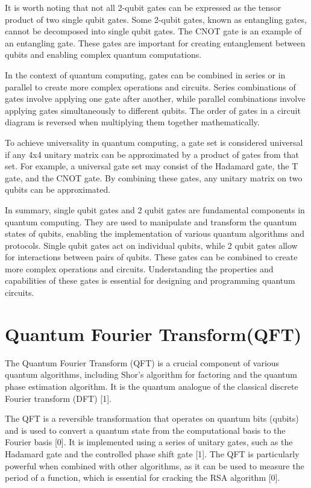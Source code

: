 \documentclass[pra,onecolumn,superscriptaddress]{revtex4}%
\begin{document}
It is worth noting that not all 2-qubit gates can be expressed as the tensor product of two single qubit gates. Some 2-qubit gates, known as entangling gates, cannot be decomposed into single qubit gates. The CNOT gate is an example of an entangling gate. These gates are important for creating entanglement between qubits and enabling complex quantum computations.

In the context of quantum computing, gates can be combined in series or in parallel to create more complex operations and circuits. Series combinations of gates involve applying one gate after another, while parallel combinations involve applying gates simultaneously to different qubits. The order of gates in a circuit diagram is reversed when multiplying them together mathematically.

To achieve universality in quantum computing, a gate set is considered universal if any 4x4 unitary matrix can be approximated by a product of gates from that set. For example, a universal gate set may consist of the Hadamard gate, the T gate, and the CNOT gate. By combining these gates, any unitary matrix on two qubits can be approximated.

In summary, single qubit gates and 2 qubit gates are fundamental components in quantum computing. They are used to manipulate and transform the quantum states of qubits, enabling the implementation of various quantum algorithms and protocols. Single qubit gates act on individual qubits, while 2 qubit gates allow for interactions between pairs of qubits. These gates can be combined to create more complex operations and circuits. Understanding the properties and capabilities of these gates is essential for designing and programming quantum circuits.


\section{Quantum Fourier Transform(QFT)}

The Quantum Fourier Transform (QFT) is a crucial component of various quantum algorithms, including Shor's algorithm for factoring and the quantum phase estimation algorithm. It is the quantum analogue of the classical discrete Fourier transform (DFT) [1].

The QFT is a reversible transformation that operates on quantum bits (qubits) and is used to convert a quantum state from the computational basis to the Fourier basis [0]. It is implemented using a series of unitary gates, such as the Hadamard gate and the controlled phase shift gate [1]. The QFT is particularly powerful when combined with other algorithms, as it can be used to measure the period of a function, which is essential for cracking the RSA algorithm [0].
\end{document}
